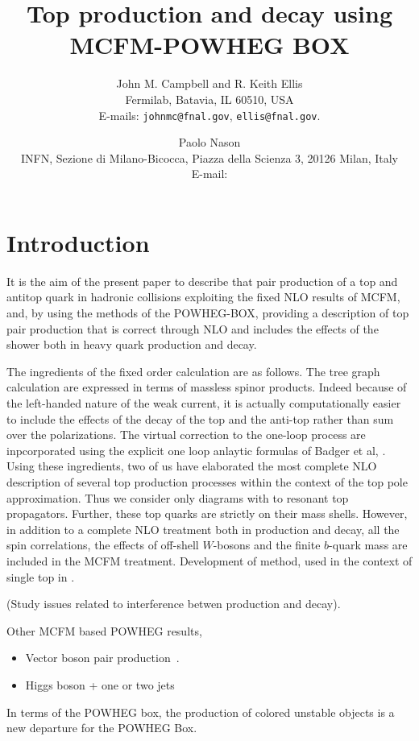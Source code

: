 \documentclass[paper]{JHEP3}
\title{Top production and decay using MCFM-POWHEG BOX}
\author{
    John M. Campbell and R. Keith Ellis
    \\
    Fermilab, Batavia, IL 60510, USA
    \\
    E-mails: 
    {\tt johnmc@fnal.gov}, 
    {\tt ellis@fnal.gov}.}
\author{Paolo Nason\\
  INFN, Sezione di Milano-Bicocca,
  Piazza della Scienza 3, 20126 Milan, Italy\\
  E-mail: \email{Paolo.Nason@mib.infn.it}}
\begin{document}

\section{Introduction} 

It is the aim of the present paper to describe that pair production of a top and 
antitop quark in hadronic collisions exploiting the fixed NLO results of MCFM,
and, by using the methods of the POWHEG-BOX, providing a description of top pair production
that is correct through NLO and includes the effects of the shower 
both in heavy quark production and decay.

The ingredients of the fixed order calculation are as follows. 
The tree graph calculation are expressed in terms of massless 
spinor products. Indeed because of the left-handed nature of the 
weak current, it is actually computationally easier to include
the effects of the decay of the top and the anti-top rather than sum 
over the polarizations\cite{Kleiss:1988xr}. The virtual correction to the one-loop
process are inpcorporated using the explicit one loop anlaytic formulas of 
Badger et al, \cite{Badger:2011yu}. Using these ingredients,
two of us have elaborated the most complete NLO description of 
several top production processes within the context of the top
pole approximation\cite{Campbell:2012uf}. Thus we consider only diagrams
with to resonant top propagators. Further, these top quarks are strictly on
their mass shells. However, in addition to a complete NLO treatment both in 
production and decay,
all the spin correlations, the effects of off-shell $W$-bosons
and the finite $b$-quark mass are included in the MCFM treatment.
Development of method, used in the context of single top in \cite{Campbell:2004ch}.

(Study issues related to interference betwen production and decay).

Other MCFM based POWHEG results,
\begin{itemize}
\item
Vector boson pair production~\cite{Melia:2011tj}.
\item
Higgs boson + one or two jets~\cite{Campbell:2012am}
\end{itemize}
In terms of the POWHEG box, the production of colored unstable objects
is a new departure for the POWHEG Box.
 
\end{document}
